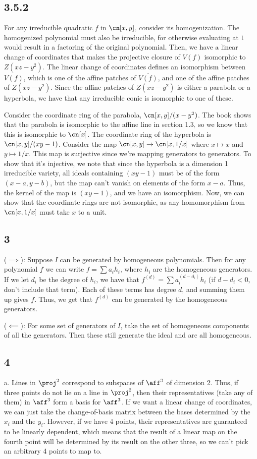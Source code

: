 \documentclass{article}
\newcommand{\conj}{\overline}
\begin{document}
\subsection*{3.5.2}
For any irreducible quadratic $f$ in $\cn[x,y]$, consider its homogenization. The homogenized polynomial must also be irreducible, for otherwise evaluating at $1$ would result in a factoring of the original polynomial. Then, we have a linear change of coordinates that makes the projective closure of $V(f)$ isomorphic to $Z(xz-y^2)$. The linear change of coordinates defines an isomorphism between $V(f)$, which is one of the affine patches of $\conj{V(f)}$, and one of the affine patches of $Z(xz-y^2)$. Since the affine patches of $Z(xz-y^2)$ is either a parabola or a hyperbola, we have that any irreducible conic is isomorphic to one of these.

Consider the coordinate ring of the parabola, $\cn[x,y]/(x-y^2)$. The book shows that the parabola is isomorphic to the affine line in section 1.3, so we know that this is isomorphic to $\cn[x]$. The coordinate ring of the hyperbola is $\cn[x,y]/(xy-1)$. Consider the map $\cn[x,y]\to\cn[x,1/x]$ where $x\mapsto x$ and $y\mapsto 1/x$. This map is surjective since we're mapping generators to generators. To show that it's injective, we note that since the hyperbola is a dimension 1 irreducible variety, all ideals containing $(xy-1)$ must be of the form $(x-a,y-b)$, but the map can't vanish on elements of the form $x-a$. Thus, the kernel of the map is $(xy-1)$, and we have an isomorphism. Now, we can show that the coordinate rings are not isomorphic, as any homomorphism from $\cn[x,1/x]$ must take $x$ to a unit.
\subsection*{3}
($\implies$): Suppose $I$ can be generated by homogeneous polynomials. Then for any polynomial $f$ we can write $f=\sum a_ih_i$, where $h_i$ are the homogeneous generators. If we let $d_i$ be the degree of $h_i$, we have that $f^{(d)}=\sum a_i^{(d-d_i)}h_i$ (if $d-d_i<0$, don't include that term). Each of these terms has degree $d$, and summing them up gives $f$. Thus, we get that $f^{(d)}$ can be generated by the homogeneous generators.

($\impliedby$): For some set of generators of $I$, take the set of homogeneous components of all the generators. Then these still generate the ideal and are all homogeneous.
\subsection*{4}
a. Lines in $\proj^2$ correspond to subspaces of $\aff^3$ of dimension 2. Thus, if three points do not lie on a line in $\proj^2$, then their representatives (take any of them) in $\aff^3$ form a basis for $\aff^3$. If we want a linear change of coordinates, we can just take the change-of-basis matrix between the bases determined by the $x_i$ and the $y_i$. However, if we have 4 points, their representatives are guaranteed to be linearly dependent, which means that the result of a linear map on the fourth point will be determined by its result on the other three, so we can't pick an arbitrary 4 points to map to.
\end{document}
